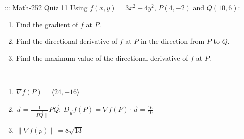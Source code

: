 ::: Math-252 Quiz 11
Using \(f(x,y)=3x^2+4y^2\), \(P(4,-2)\) and \(Q(10,6)\):
\begin{enumerate}[label=\alph*.]
  \item Find the gradient of \(f\) at \(P\).
  \item Find the directional derivative of \(f\) at \(P\) in the direction from
    \(P\) to \(Q\).
  \item Find the maximum value of the directional derivative of \(f\) at \(P\).
\end{enumerate}
===
\begin{enumerate}[label=\alph*.]
  \item \(\nabla f(P)=\langle 24,-16\rangle\)
  \item \(\displaystyle
    \vec u=\frac{1}{\|\overrightarrow{PQ}\|}\overrightarrow{PQ};\
    D_{\vec u}f(P)=\nabla f(P)\cdot\vec u=\frac{16}{10}\)
  \item \(\|\nabla f(p)\|=8\sqrt{13}\)
\end{enumerate}

